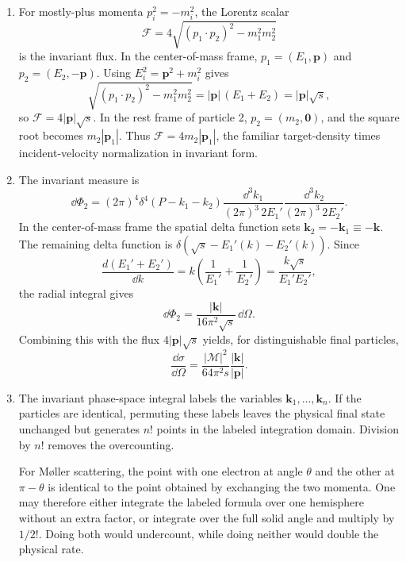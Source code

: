 \begin{enumerate}
\begin{enumerate}
\item
For mostly-plus momenta \(p_i^2=-m_i^2\), the Lorentz scalar
\[
 \mathcal F=4\sqrt{(p_1\cdot p_2)^2-m_1^2m_2^2}
\]
is the invariant flux.  In the center-of-mass frame,
\(p_1=(E_1,\mathbf p)\) and \(p_2=(E_2,-\mathbf p)\).
Using \(E_i^2=\mathbf p^2+m_i^2\) gives
\[
 \sqrt{(p_1\cdot p_2)^2-m_1^2m_2^2}
 =|\mathbf p|\,(E_1+E_2)=|\mathbf p|\sqrt s,
\]
so \(\mathcal F=4|\mathbf p|\sqrt s\).  In the rest frame of particle
2, \(p_2=(m_2,\mathbf0)\), and the square root becomes
\(m_2|\mathbf p_1|\).  Thus \(\mathcal F=4m_2|\mathbf p_1|\), the
familiar target-density times incident-velocity normalization in invariant
form.
\item
The invariant measure is
\[
 \dd\Phi_2=(2\pi)^4\delta^4(P-k_1-k_2)
 \frac{\dd^3k_1}{(2\pi)^3\,2E_1'}
 \frac{\dd^3k_2}{(2\pi)^3\,2E_2'}.
\]
In the center-of-mass frame the spatial delta function sets
\(\mathbf k_2=-\mathbf k_1\equiv-\mathbf k\).  The remaining delta
function is \(\delta(\sqrt s-E_1'(k)-E_2'(k))\).  Since
\[
 \frac{d(E_1'+E_2')}{\dd k}
 =k\left(\frac1{E_1'}+\frac1{E_2'}\right)
 =\frac{k\sqrt s}{E_1'E_2'},
\]
the radial integral gives
\[
 \dd\Phi_2=\frac{|\mathbf k|}{16\pi^2\sqrt s}\,\dd\Omega.
\]
Combining this with the flux
\(4|\mathbf p|\sqrt s\) yields, for distinguishable final particles,
\[
 \boxed{\;
 \frac{\dd\sigma}{\dd\Omega}
 =\frac{|\mathcal M|^2}{64\pi^2s}
 \frac{|\mathbf k|}{|\mathbf p|}.\;}
\]
\item
The invariant phase-space integral labels the variables
\(\mathbf k_1,\ldots,\mathbf k_n\).  If the particles are identical,
permuting these labels leaves the physical final state unchanged but
generates \(n!\) points in the labeled integration domain.  Division by
\(n!\) removes the overcounting.

For Møller scattering, the point with one electron at angle \(\theta\) and
the other at \(\pi-\theta\) is identical to the point obtained by exchanging
the two momenta.  One may therefore either integrate the labeled formula
over one hemisphere without an extra factor, or integrate over the full
solid angle and multiply by \(1/2!\).  Doing both would undercount, while
doing neither would double the physical rate.
\end{enumerate}


\end{enumerate}
